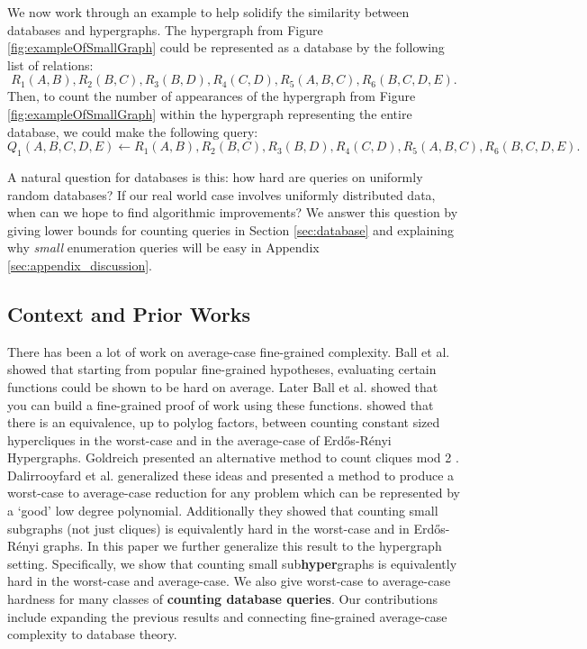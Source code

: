 \documentclass[11pt,letterpaper,pdftex]{article}
\begin{document}
We now work through an example to help solidify the similarity between databases and hypergraphs.
The hypergraph from Figure \ref{fig:exampleOfSmallGraph} could be represented as a database by the following list of relations: 
$$R_1(A,B), R_2(B,C), R_3(B, D), R_4(C, D), R_5(A,B,C), R_6(B,C,D,E).$$
Then, to count the number of appearances of the hypergraph from Figure \ref{fig:exampleOfSmallGraph} within the hypergraph representing the entire database, we could make the following query:
$$Q_1(A,B,C,D,E) \leftarrow R_1(A,B), R_2(B,C), R_3(B, D), R_4(C, D), R_5(A,B,C), R_6(B,C,D,E).$$ 

A natural question for databases is this: how hard are queries on uniformly random databases? 
If our real world case involves uniformly distributed data, when can we hope to find algorithmic improvements?
We answer this question by giving lower bounds for counting queries in Section \ref{sec:database} and explaining why \emph{small} enumeration queries will be easy in Appendix \ref{sec:appendix_discussion}. 

\subsection{Context and Prior Works}

There has been a lot of work on average-case fine-grained complexity. Ball et al. 
\cite{BallWorstToAvg} showed that starting from popular fine-grained hypotheses, evaluating certain functions could be shown to be hard on average. Later Ball et al. \cite{BallRSV18} showed that you can build a fine-grained proof of work using these functions. 
\cite{UniformCliqueABB} showed that there is an equivalence, up to polylog factors, between counting constant sized hypercliques in the worst-case and in the average-case of  Erd{\H{o}}s-R{\'{e}}nyi Hypergraphs. 
Goldreich presented an alternative method to count cliques mod 2 \cite{Goldreich20}. 
Dalirrooyfard et al. \cite{factoredProblems} generalized these ideas and presented a method to produce a worst-case to average-case reduction for any problem which can be represented by a `good' low degree polynomial.
Additionally they showed that counting small subgraphs (not just cliques) is equivalently hard in the worst-case and in Erd{\H{o}}s-R{\'{e}}nyi graphs. 
In this paper we further generalize this result to the hypergraph setting.
Specifically, we show that counting small sub\textbf{hyper}graphs is equivalently hard in the worst-case and average-case. 
We also give worst-case to average-case hardness for many classes of \textbf{counting database queries}. 
Our contributions include expanding the previous results and connecting fine-grained average-case complexity to database theory. 
\end{document}
